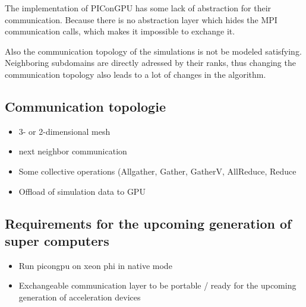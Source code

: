 The implementation of PIConGPU has some lack of abstraction for their
communication. Because there is no abstraction layer which hides
the MPI communication calls, which makes it impossible to exchange it.

Also the communication topology of the simulations is not be modeled
satisfying. Neighboring subdomains are directly adressed by their
ranks, thus changing the communication topology also leads
to a lot of changes in the algorithm.

\subsection{Communication topologie}
\begin{itemize}
\item 3- or 2-dimensional mesh
\item next neighbor communication
\item Some collective operations (Allgather, Gather, GatherV, AllReduce, Reduce
\item Offload of simulation data to GPU
\end{itemize}


\subsection{Requirements for the upcoming generation of super computers}
\begin{itemize}
\item Run picongpu on xeon phi in native mode
\item Exchangeable communication layer to be portable / ready  for the upcoming
  generation of acceleration devices
\end{itemize}



\cleardoublepage

